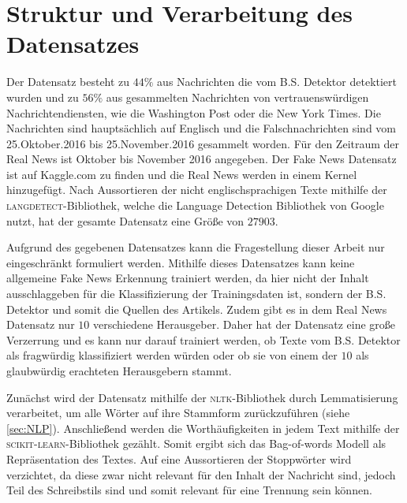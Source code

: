 \chapter{Struktur und Verarbeitung des Datensatzes}

Der Datensatz besteht zu $44\%$ aus Nachrichten die vom B.S. Detektor detektiert wurden und zu $56\%$ aus gesammelten 
Nachrichten von vertrauenswürdigen Nachrichtendiensten, wie die Washington Post oder die New York Times. Die Nachrichten 
sind hauptsächlich auf Englisch und die Falschnachrichten sind vom 25.Oktober.2016 bis 25.November.2016 gesammelt worden. Für den Zeitraum 
der Real News ist Oktober bis November 2016 angegeben. 
Der Fake News Datensatz ist auf Kaggle.com zu finden\cite{fake_data} und die Real News werden in einem Kernel hinzugefügt\cite{real_data}.
Nach Aussortieren der nicht englischsprachigen Texte mithilfe der \textsc{langdetect}-Bibliothek\cite{langdetect}, welche die
Language Detection Bibliothek von Google\cite{google_langdetect} nutzt, hat der gesamte Datensatz eine Größe von 
$\num{27903}$.

Aufgrund des gegebenen Datensatzes kann die Fragestellung dieser Arbeit nur eingeschränkt formuliert werden.
Mithilfe dieses Datensatzes kann keine allgemeine Fake News Erkennung trainiert werden, da hier nicht der Inhalt 
ausschlaggeben für die Klassifizierung der Trainingsdaten ist, sondern der B.S. Detektor und somit die Quellen des 
Artikels. 
Zudem gibt es in dem Real News Datensatz nur $10$ verschiedene Herausgeber.
Daher hat der Datensatz eine große Verzerrung und es kann nur darauf trainiert werden, ob Texte vom B.S. Detektor 
als fragwürdig klassifiziert werden würden oder ob sie von einem der $10$ als glaubwürdig erachteten Herausgebern stammt.

Zunächst wird der Datensatz mithilfe der \textsc{nltk}-Bibliothek\cite{nltk} durch Lemmatisierung verarbeitet, um 
alle Wörter auf ihre Stammform zurückzuführen (siehe \ref{sec:NLP}). 
Anschließend werden die Worthäufigkeiten in jedem Text mithilfe der \textsc{scikit-learn}-Bibliothek\cite{scikit-learn} 
gezählt. 
Somit ergibt sich das Bag-of-words Modell als Repräsentation des Textes.
Auf eine Aussortieren der Stoppwörter wird verzichtet, da diese zwar nicht relevant für den Inhalt der Nachricht sind,
jedoch Teil des Schreibstils sind und somit relevant für eine Trennung sein können.

